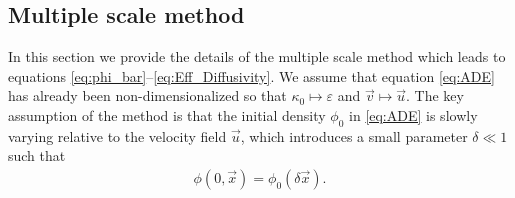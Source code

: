 \documentclass[11pt]{amsart}
\begin{document}
\subsection{Multiple scale method}\label{sec:Multiscal_Method}
%
In this section we provide the details of the multiple scale method
\cite{McLaughlin:SIAM_JAM:780,Papanicolaou:1981:36:8,Papanicolaou:RF-835,Bensoussan:Book:1978}
which leads to equations
\eqref{eq:phi_bar}--\eqref{eq:Eff_Diffusivity}. We assume that
equation \eqref{eq:ADE} has already been non-dimensionalized so that
$\kappa_0\mapsto\varepsilon$ and $\vec{v}\mapsto\vec{u}$. The key assumption of the method is
that the initial density $\phi_0$ in \eqref{eq:ADE} is slowly
varying relative to the velocity field $\vec{u}$, which introduces a
small parameter $\delta\ll1$ such that  
% 
\begin{align}\label{eq:IC}
  \phi(0,\vec{x})=\phi_0(\delta\vec{x}).
\end{align}
%
\end{document}
